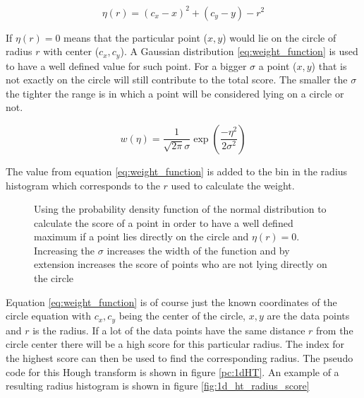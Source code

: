 \documentclass[11pt,twoside]{scrreprt}
\begin{document}
\begin{equation}
\label{eq:score_function}
  \eta(r) = (c_x - x)^2 + (c_y - y) - r ^ 2
\end{equation}

If $\eta(r)=0$ means that the particular point ($x,y$) would lie on the circle of radius $r$ with center ($c_x, c_y$).
A Gaussian distribution \ref{eq:weight_function} is used to have a well defined value for such point. For a bigger $\sigma$ a point 
($x,y$) that is not exactly on the circle will still contribute to the total score. The smaller the $\sigma$ the tighter the range is
in which a point will be considered lying on a circle or not.

\begin{equation}
\label{eq:weight_function}
  w(\eta) = \frac{1}{\sqrt{2\pi}\sigma}\exp\left( \frac{-\eta^2}{2\sigma^2}\right)
\end{equation}

The value from equation \ref{eq:weight_function} is added to the bin in the radius histogram which corresponds to the $r$ used to
calculate the weight.

\begin{figure}[ht]
\centering
    \caption[Normal Distribution: Used as a weight function]{Using the probability density function of the normal distribution to 
    calculate the score of a point in order to have a well defined maximum if a point lies directly on the circle and $\eta(r) = 0$. 
    Increasing the $\sigma$ increases the width of the function and by extension increases the score of points who are not lying 
    directly on the circle}
  \label{fig:gauss}
\end{figure}
Equation \ref{eq:weight_function} is of course just the known coordinates of the circle equation with $c_x, c_y$ being the center of 
the circle, $x, y$ are the data points and $r$ is the radius. If a lot of the data points have the same distance $r$ from the circle 
center there will be a high score for this particular radius. The index for the highest score can then be used to find the 
corresponding radius. The pseudo code for this Hough transform is shown in figure \ref{pc:1dHT}. An example of a resulting radius
histogram is shown in figure \ref{fig:1d_ht_radius_score}
\end{document}
